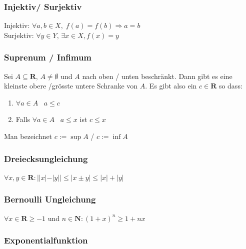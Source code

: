\documentclass[8pt]{extarticle}
\begin{document}
\begin{multicols*}{3}
    \subsubsection {Injektiv/ Surjektiv}
  
  Injektiv: $\forall a, b \in X, \;f(a) = f(b) \Rightarrow a = b$\\
  Surjektiv: $\forall y \in Y, \, \exists x \in X, f(x) = y$

    \subsubsection {Suprenum / Infimum}
  
  Sei $A \subseteq \mathbf{R}$, $ A \neq \emptyset$ und $A$ nach oben / unten beschränkt. Dann gibt es
  eine kleinste obere /grösste untere Schranke von $A$. Es gibt also ein $c \in \mathbf{R}$ so dass:
  \begin{enumerate}
    \item $\forall a \in A \; \; \; a \leq c$
    \item Falls $\forall a \in A \; \; \; a \leq x$ ist $c \leq x$
  \end{enumerate}
  Man bezeichnet $c := \sup A$ / $c := \inf A$ 


    \subsubsection {Dreiecksungleichung}
  
  \begin{center}
    $\forall x, y \in \mathbf{R} : ||x| - |y|| \leq |x \pm y| \leq |x| + |y|$
  \end{center}

    \subsubsection {Bernoulli Ungleichung}
  
  \begin{center}
    $ \forall x \in \mathbf{R} \geq -1$ und $n \in \mathbf{N}: (1 + x)^{n} \geq 1 + nx$
  \end{center}

    \subsubsection {Exponentialfunktion}
  

\end{multicols*}
\end{document}
